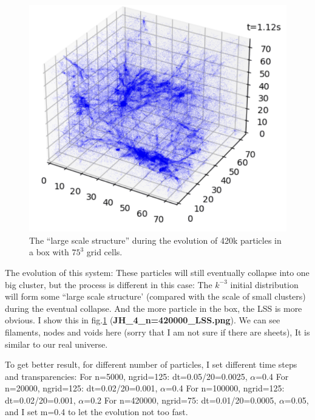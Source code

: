 \documentclass[showpacs, oneside, onecolumn, prl, amsmath, amssymb, nofootinbib, superscriptaddress, notitlepage]{revtex4-1}
\newcommand\bfig{\begin{figure}}
\newcommand\efig{\end{figure}}
\begin{document}
~~~~
\bfig
	\centering
	\includegraphics[scale=0.8]{JH_4_n=420000_LSS.png}
	\caption{The ``large scale structure'' during the evolution of 420k particles in a box with $75^3$ grid cells.}
	\label{4-LSS}
\efig

The evolution of this system: These particles will still eventually collapse into one big cluster, but the process is different in this case:\newline
The $k^{-3}$ initial distribution will form some ``large scale structure' (compared with the scale of small clusters) during the eventual collapse. And the more particle in the box, the LSS is more obvious. I show this in fig.\ref{4-LSS} (\textbf{JH\_4\_n=420000\_LSS.png}). We can see filaments, nodes and voids here (sorry that I am not sure if there are sheets), It is similar to our real universe.

To get better result, for different number of particles, I set different time steps and transparencies:\newline
For n=5000, ngrid=125: dt=0.05/20=0.0025, $\alpha$=0.4\newline
For n=20000, ngrid=125: dt=0.02/20=0.001, $\alpha$=0.4\newline
For n=100000, ngrid=125: dt=0.02/20=0.001, $\alpha$=0.2\newline
For n=420000, ngrid=75: dt=0.01/20=0.0005, $\alpha$=0.05, and I set m=0.4 to let the evolution not too fast.
\end{document}
